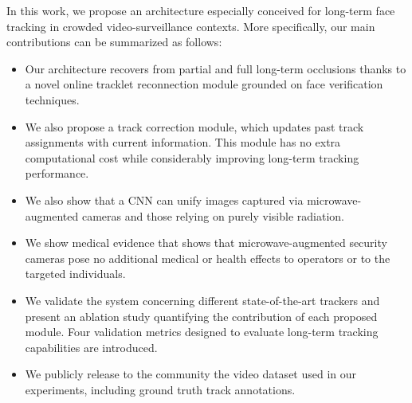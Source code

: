 In this work, we propose an architecture especially conceived for long-term face tracking in crowded video-surveillance contexts. More specifically, our main contributions can be summarized as follows:

\begin{itemize}
    \item Our architecture recovers from partial and full long-term occlusions thanks to a novel online tracklet reconnection module grounded on face verification techniques.
    \item We also propose a track correction module, which updates past track assignments with current information. This module has no extra computational cost while considerably improving long-term tracking performance.
    \item We also show that a CNN can unify images captured via microwave-augmented cameras and those relying on purely visible radiation. \cite{martinez2023longterm}
    \item We show medical evidence that shows that microwave-augmented security cameras pose no additional medical or health effects to operators or to the targeted individuals. 
    \item We validate the system concerning different state-of-the-art trackers and present an ablation study quantifying the contribution of each proposed module. Four validation metrics designed to evaluate long-term tracking capabilities are introduced.
    \item We publicly release to the community the video dataset used in our experiments, including ground truth track annotations.
\end{itemize}

